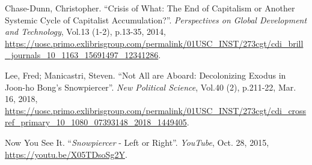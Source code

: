 \documentclass[12pt, letterpaper]{article}
\begin{document}
\begin{mla}
\begin{workscited}
	\bibent Chase-Dunn, Christopher. ``Crisis of What: The End of Capitalism
	or Another Systemic Cycle of Capitalist Accumulation?''.
	\textit{Perspectives on Global Development and Technology}, Vol.13 (1-2),
	p.13-35, 2014,
	\url{https://uosc.primo.exlibrisgroup.com/permalink/01USC_INST/273cgt/cdi_brill_journals_10_1163_15691497_12341286}.
	
	\bibent Lee, Fred; Manicastri, Steven. ``Not All are Aboard: Decolonizing
	Exodus in Joon-ho Bong’s Snowpiercer''. \textit{New Political Science},
	Vol.40 (2), p.211-22, Mar. 16, 2018,
	\url{https://uosc.primo.exlibrisgroup.com/permalink/01USC_INST/273cgt/cdi_crossref_primary_10_1080_07393148_2018_1449405}.
	
	\bibent Now You See It. ``\textit{Snowpiercer} - Left or Right''.
	\textit{YouTube}, Oct. 28, 2015,
	\url{https://youtu.be/X05TDsoSg2Y}.
\end{workscited}


\end{mla}
\end{document}
